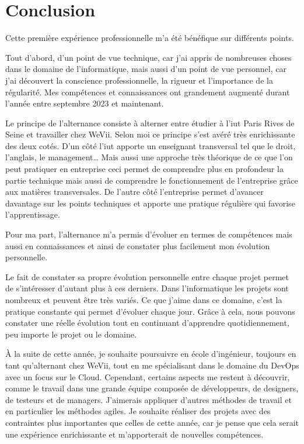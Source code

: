 \chapter*{Conclusion}
\begin{center}
    Cette première expérience professionnelle m’a été bénéfique sur différents points.

    \bigskip

    Tout d’abord, d’un point de vue technique, car j’ai appris de nombreuses choses dans le domaine de l’informatique, mais aussi d’un point de vue personnel, car j’ai découvert la conscience professionnelle, la rigueur et l’importance de la régularité.
    Mes compétences et connaissances ont grandement augmenté durant l’année entre septembre 2023 et maintenant.

    \bigskip

    Le principe de l’alternance consiste à alterner entre étudier à l’iut Paris Rives de Seine et travailler chez WeVii.
    Selon moi ce principe s’est avéré très enrichissante des deux cotés.
    D’un côté l’iut apporte un enseignant transversal tel que le droit, l’anglais, le management… Mais aussi une approche très théorique de ce que l’on peut pratiquer en entreprise ceci permet de comprendre plus en profondeur la partie technique mais aussi de comprendre le fonctionnement de l’entreprise grâce aux matières transversales.
    De l’autre côté l’entreprise permet d’avancer davantage sur les points techniques et apporte une pratique régulière qui favorise l’apprentissage.

    \bigskip

    Pour ma part, l’alternance m’a permis d’évoluer en termes de compétences mais aussi en connaissances et ainsi de constater plus facilement mon évolution personnelle.

    \bigskip

    Le fait de constater sa propre évolution personnelle entre chaque projet permet de s’intéresser d’autant plus à ces derniers.
    Dans l’informatique les projets sont nombreux et peuvent être très variés.
    Ce que j’aime dans ce domaine, c’est la pratique constante qui permet d’évoluer chaque jour.
    Grâce à cela, nous pouvons constater une réelle évolution tout en continuant d’apprendre quotidiennement, peu importe le projet ou le domaine.

    \bigskip

    À la suite de cette année, je souhaite poursuivre en école d'ingénieur, toujours en tant qu'alternant chez WeVii, tout en me spécialisant dans le domaine du DevOps avec un focus sur le Cloud.
    Cependant, certains aspects me restent à découvrir, comme le travail dans une grande équipe composée de développeurs, de designers, de testeurs et de managers.
    J'aimerais appliquer d'autres méthodes de travail et en particulier les méthodes agiles.
    Je souhaite réaliser des projets avec des contraintes plus importantes que celles de cette année, car je pense que cela serait une expérience enrichissante et m'apporterait de nouvelles compétences.


\end{center}
